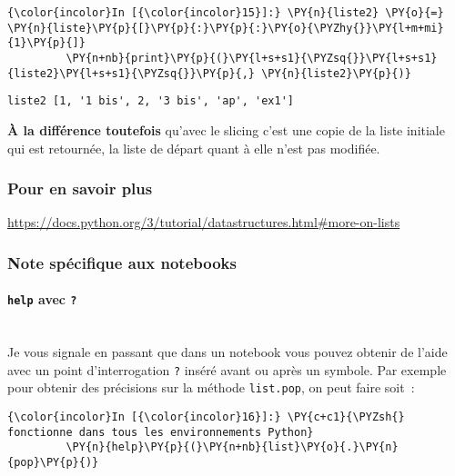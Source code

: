     \begin{Verbatim}[commandchars=\\\{\}]
{\color{incolor}In [{\color{incolor}15}]:} \PY{n}{liste2} \PY{o}{=} \PY{n}{liste}\PY{p}{[}\PY{p}{:}\PY{p}{:}\PY{o}{\PYZhy{}}\PY{l+m+mi}{1}\PY{p}{]}
         \PY{n+nb}{print}\PY{p}{(}\PY{l+s+s1}{\PYZsq{}}\PY{l+s+s1}{liste2}\PY{l+s+s1}{\PYZsq{}}\PY{p}{,} \PY{n}{liste2}\PY{p}{)}
\end{Verbatim}


    \begin{Verbatim}[commandchars=\\\{\}]
liste2 [1, '1 bis', 2, '3 bis', 'ap', 'ex1']

    \end{Verbatim}

    \textbf{À la différence toutefois} qu'avec le slicing c'est une copie de
la liste initiale qui est retournée, la liste de départ quant à elle
n'est pas modifiée.

    \hypertarget{pour-en-savoir-plus}{%
\subsubsection{Pour en savoir plus}\label{pour-en-savoir-plus}}

    \href{https://docs.python.org/3/tutorial/datastructures.html\#more-on-lists}{https://docs.python.org/3/tutorial/datastructures.html\#more-on-lists}

    \hypertarget{note-spuxe9cifique-aux-notebooks}{%
\subsubsection{Note spécifique aux
notebooks}\label{note-spuxe9cifique-aux-notebooks}}

    \hypertarget{help-avec}{%
\paragraph{\texorpdfstring{\texttt{help} avec
\texttt{?}}{help avec ?}\\\\}\label{help-avec}}

    Je vous signale en passant que dans un notebook vous pouvez obtenir de
l'aide avec un point d'interrogation \texttt{?} inséré avant ou après un
symbole. Par exemple pour obtenir des précisions sur la méthode
\texttt{list.pop}, on peut faire soit~:

    \begin{Verbatim}[commandchars=\\\{\}]
{\color{incolor}In [{\color{incolor}16}]:} \PY{c+c1}{\PYZsh{} fonctionne dans tous les environnements Python}
         \PY{n}{help}\PY{p}{(}\PY{n+nb}{list}\PY{o}{.}\PY{n}{pop}\PY{p}{)}
\end{Verbatim}


